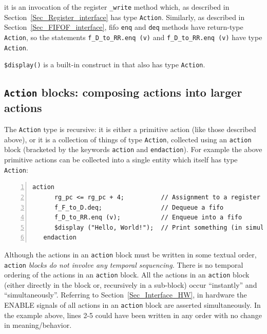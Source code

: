 {\ie} it is an invocation of the register \verb|_write| method which,
as described in
Section~\ref{Sec_Register_interface} has type
\verb|Action|.  Similarly, as described in
Section~\ref{Sec_FIFOF_interface}, fifo \verb|enq|
and \verb|deq| methods have return-type \verb|Action|, so the
statements \verb|f_D_to_RR.enq (v)| and \verb|f_D_to_RR.enq (v)| have
type \verb|Action|.


\verb|$display()| is a built-in construct in {\BSV} that also has type
\verb|Action|.


\subsection{{\tt Action} blocks: composing actions into larger actions}


The \verb|Action| type is recursive: it is either a primitive action
(like those described above), or it is a collection of things of type
\verb|Action|, collected using an \verb|action| block (bracketed by
the {\BSV} keywords \verb|action| and \verb|endaction|).  For example the
above primitive actions can be collected into a single entity which
itself has type \verb|Action|:

{\footnotesize
\begin{Verbatim}[frame=single, numbers=left]
   action
      rg_pc <= rg_pc + 4;          // Assignment to a register
      f_F_to_D.deq;                // Dequeue a fifo
      f_D_to_RR.enq (v);           // Enqueue into a fifo
      $display ("Hello, World!");  // Print something (in simulation only)
   endaction
\end{Verbatim}
}

Although the actions in an \verb|action| block must be written in some
textual order, \verb|action| \emph{blocks do not involve any temporal
sequencing.}  There is no temporal ordering of the actions in an
\verb|action| block.  All the actions in an \verb|action| block
(either directly in the block or, recursively in a sub-block) occur
``instantly'' and ``simultaneously''.  Referring to
Section~\ref{Sec_Interface_HW}, in hardware the ENABLE signals of all
actions in an \verb|action| block are asserted simultaneously.  In the
example above, lines 2-5 could have been written in any order with no
change in meaning/behavior.

